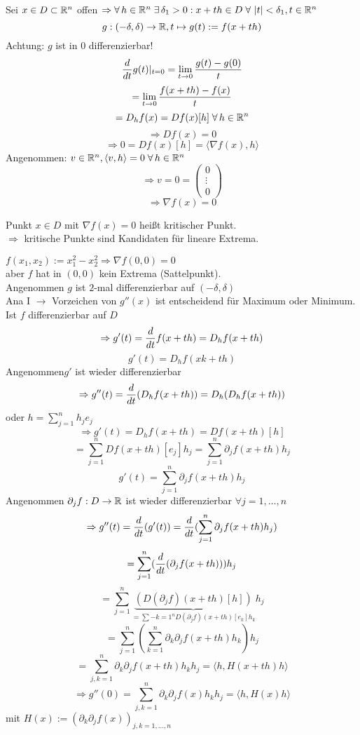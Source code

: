 \documentclass[../ana2.tex]{subfiles}
\begin{document}
\begin{bew}
    Sei \(x \in D \subset \mathbb{R}^n\) offen \(\Rightarrow \forall h \in \R^n \; 
    \exists \delta_1 > 0: x +th \in D \; \forall \abs{t} < \delta_1, t \in \R^n \) \\
    \[ g:(-\delta, \delta)\rightarrow \mathbb{R}, t \mapsto g(t):= f(x+th) \]
    Achtung: \(g\) ist in \(0\) differenzierbar!
    \[ \frac{d}{dt} g(t) \vert_{t=0} = \lim\limits_{t\rightarrow{}0} \frac{g(t)-g(0)}{t} \]
    \[ = \lim\limits_{t\rightarrow{}0} \frac{f(x+th)- f(x)}{t} \]
    \[ = D_hf(x) = Df(x)[h] \; \forall h \in \R^n \]
    \[ \Rightarrow Df(x) = 0 \]
    \[ \Rightarrow 0 = Df(x)[h] = \langle \nabla f(x), h \rangle \]
    Angenommen: \(v \in \R^n, \langle v, h \rangle = 0 \; \forall h \in \R^n\)
    \[ \Rightarrow v = 0 = \begin{pmatrix}
        0\\
        \vdots\\
        0
    \end{pmatrix} \]
    \[ \Rightarrow \nabla f(x) = 0 \]
\end{bew}
\begin{bem}
    Punkt \(x \in D\) mit \(\nabla f(x) = 0\) heißt kritischer Punkt.\\
    \( \Rightarrow \) kritische Punkte sind Kandidaten für lineare Extrema.
\end{bem}
\begin{bsp}
    \(f(x_1, x_2) := x_1^2 - x_2^2 \Rightarrow \nabla f(0, 0) = 0\)\\
    aber \(f\) hat in \((0,0)\) kein Extrema (Sattelpunkt).\\
    Angenommen \(g\) ist \(2\)-mal differenzierbar auf \((-\delta, \delta)\)\\
    Ana I \(\rightarrow\) Vorzeichen von \(g''(x)\) ist entscheidend für 
    Maximum oder Minimum.\\
    Ist \(f\) differenzierbar auf \(D\)
    \[ \Rightarrow g'(t) = \frac{d}{dt} f(x+th) = D_hf(x+th) \]
    \[ g'(t) = D_h f(xk+th) \]
    Angenommen\(g'\) ist wieder differenzierbar
    \[ \Rightarrow g''(t) = \frac{d}{dt} (D_hf(x+th)) = D_h(D_hf(x+th)) \]
    oder \( h = \sum_{j=1}^n h_j e_j \)
    \[ \Rightarrow g'(t) = D_hf(x+th) = Df(x+th)[h] \]
    \[ = \sum_{j=1}^n Df(x+th)[e_j]h_j = \sum_{j=1}^n \partial_j f(x+th)h_j \]
    \[ g'(t) = \sum_{j=1}^n \partial_j f(x+th) h_j \]
    Angenommen \( \partial_j f:D\rightarrow \mathbb{R} \) ist wieder differenzierbar \(\forall j=1, \ldots, n\)
    \[ \Rightarrow g''(t) = \frac{d}{dt} (g'(t)) = \frac{d}{dt} (\sum_{j=1}^n \partial_j f(x+th)h_j) \]
    \[ = \sum_{j=1}^n  (\frac{d}{dt}(\partial_j f(x+th)))h_j\]
    \[ = \sum_{j=1}^n 
    \underbrace{(D(\partial_j f)(x+th)[h])}_{= \sum-{k=1}^n D(\partial_jf)(x+th)[e_k]h_k} h_j \]
    \[ = \sum_{j=1}^n ( \sum_{k=1}^n \partial_k \partial_j f(x+th)h_k)h_j \]
    \[ = \sum_{j,k = 1}^n \partial_k \partial_j f(x+th)h_k h_j = \langle h, H(x+th)h \rangle \]
    \[ \Rightarrow g''(0) = \sum_{j,k = 1}^n \partial_k \partial_j f(x) h_k h_j 
    = \langle h, H(x)h \rangle \]
    mit \(H(x) := (\partial_k \partial_j f(x))_{j,k=1,\ldots,n} \) 
\end{bsp}
\end{document}
